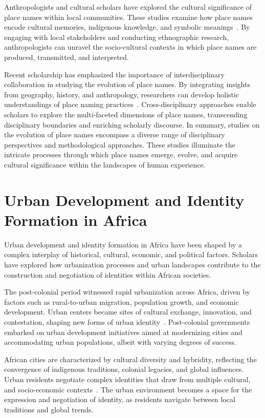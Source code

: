 Anthropologists and cultural scholars have explored the cultural significance of place names within local communities. These studies examine how place names encode cultural memories, indigenous knowledge, and symbolic meanings~\cite{Gelling}. By engaging with local stakeholders and conducting ethnographic research, anthropologists can unravel the socio-cultural contexts in which place names are produced, transmitted, and interpreted.

Recent scholarship has emphasized the importance of interdisciplinary collaboration in studying the evolution of place names. By integrating insights from geography, history, and anthropology, researchers can develop holistic understandings of place naming practices~\cite{Bolstad}. Cross-disciplinary approaches enable scholars to explore the multi-faceted dimensions of place names, transcending disciplinary boundaries and enriching scholarly discourse. In summary, studies on the evolution of place names encompass a diverse range of disciplinary perspectives and methodological approaches. These studies illuminate the intricate processes through which place names emerge, evolve, and acquire cultural significance within the landscapes of human experience.

\section{Urban Development and Identity Formation in Africa}
Urban development and identity formation in Africa have been shaped by a complex interplay of historical, cultural, economic, and political factors. Scholars have explored how urbanization processes and urban landscapes contribute to the construction and negotiation of identities within African societies.

The post-colonial period witnessed rapid urbanization across Africa, driven by factors such as rural-to-urban migration, population growth, and economic development. Urban centers became sites of cultural exchange, innovation, and contestation, shaping new forms of urban identity~\cite{Onilude}. Post-colonial governments embarked on urban development initiatives aimed at modernizing cities and accommodating urban populations, albeit with varying degrees of success.

African cities are characterized by cultural diversity and hybridity, reflecting the convergence of indigenous traditions, colonial legacies, and global influences. Urban residents negotiate complex identities that draw from multiple cultural, and socio-economic contexts~\cite{Onilude}. The urban environment becomes a space for the expression and negotiation of identity, as residents navigate between local traditions and global trends.

